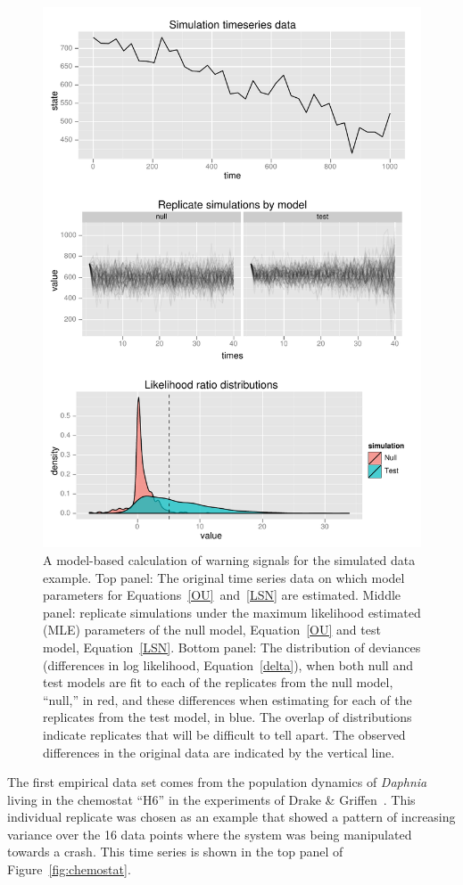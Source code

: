 \documentclass[authoryear,review,11pt]{elsarticle}
\begin{document}
 \begin{figure}
   \begin{center}
     \includegraphics[width=.73\linewidth]{figures/Simulation_warningsignal.pdf}
     \caption{A model-based calculation of warning signals for the simulated data example.  Top panel: The original time series data on which model parameters for Equations~\eqref{OU}~and~\eqref{LSN} are estimated. Middle panel: replicate simulations under the maximum likelihood estimated (MLE) parameters of the null model, Equation~\eqref{OU} and test model, Equation~\eqref{LSN}.  Bottom panel: The distribution of deviances (differences in log likelihood, Equation~\eqref{delta}), when both null and test models are fit to each of the replicates from the null model, ``null,'' in red, and these differences when estimating for each of the replicates from the test model, in blue.  The overlap of distributions indicate replicates that will be difficult to tell apart.  The observed differences in the original data are indicated by the vertical line.}
     \label{fig:simulation}
  \end{center}
 \end{figure}

The first empirical data set comes from the population dynamics of
\emph{Daphnia} living in the chemostat ``H6'' in the experiments of Drake \& Griffen~\citep{Drake2010}.
This individual replicate was chosen as an example that showed
a pattern of increasing variance over the 16 data points where the system was being manipulated towards a crash.
This time series is shown in the top panel of Figure~\ref{fig:chemostat}.
\end{document}
